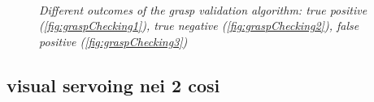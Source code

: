 \begin{figure}
	\centering
	\\
	\caption{\textit{Different outcomes of the grasp validation algorithm: true positive (\ref{fig:graspChecking1}), true negative (\ref{fig:graspChecking2}), false positive (\ref{fig:graspChecking3})}}
	\label{fig:graspChecking}
\end{figure}



\subsection{visual servoing nei 2 cosi}\label{subsec:visualServoingNellaAction}


